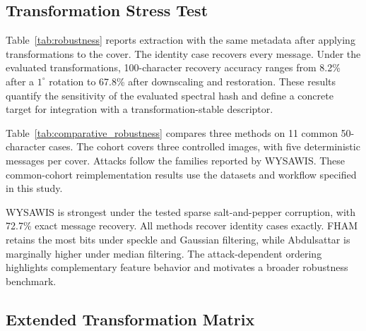 \documentclass[preprint,12pt]{elsarticle}
\theoremstyle{plain}
\begin{document}
\begin{table}[!t]
\centering
\small
\caption{Held-out endpoint-observation detection for four local TCP/TLS profiles.}
\label{tab:step2_endpoint_detection}

\end{table}

\subsection{Transformation Stress Test}

Table~\ref{tab:robustness} reports extraction with
the same metadata after applying transformations to the cover. The identity
case recovers every message. Under the evaluated transformations,
100-character recovery accuracy ranges from 8.2\% after a
$1^\circ$ rotation to 67.8\% after downscaling and restoration. These results
quantify the sensitivity of the evaluated spectral hash and define a concrete
target for integration with a transformation-stable descriptor.

\begin{table}[!t]
\centering
\caption{Recovery After Cover Transformations}
\label{tab:robustness}

\end{table}

Table~\ref{tab:comparative_robustness} compares three methods on 11 common
50-character cases. The cohort covers three controlled images, with five
deterministic messages per cover. Attacks follow the families reported by
WYSAWIS. These common-cohort reimplementation results use the datasets and
workflow specified in this study.

\begin{table}[!t]
\centering
\caption{Common-Cohort Bit Accuracy for the Three Mapping Methods}
\label{tab:comparative_robustness}
\resizebox{\linewidth}{!}{}
\end{table}

WYSAWIS is strongest under the tested sparse salt-and-pepper corruption, with
72.7\% exact message recovery. All methods recover identity cases exactly.
FHAM retains the most bits
under speckle and Gaussian filtering, while Abdulsattar is marginally higher
under median filtering. The attack-dependent ordering highlights complementary
feature behavior and motivates a broader robustness benchmark.

\subsection{Extended Transformation Matrix}
\end{document}
